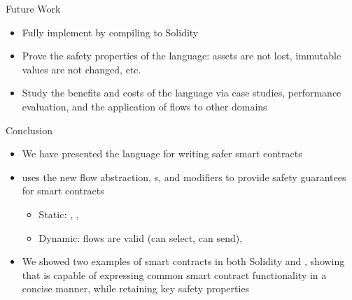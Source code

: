\documentclass[leqno,presentation,usenames,dvipsnames]{beamer}
\begin{document}
\begin{frame}{Future Work}
    \begin{itemize}
        \item Fully implement \langName by compiling to Solidity
        \item Prove the safety properties of the language: assets are not lost, immutable values are not changed, etc.
        \item Study the benefits and costs of the language via case studies, performance evaluation, and the application of flows to other domains
    \end{itemize}
\end{frame}

\begin{frame}{Conclusion}
    \begin{itemize}
        \item We have presented the \langName language for writing safer smart contracts
        \item \langName uses the new flow abstraction, \assetTxt{}s, and modifiers to provide safety guarantees for smart contracts
            \begin{itemize}
                \item Static: , , 
                \item Dynamic: flows are valid (can select, can send), 
            \end{itemize}
        \item We showed two examples of smart contracts in both Solidity and \langName, showing that \langName is capable of expressing common smart contract functionality in a concise manner, while retaining key safety properties
    \end{itemize}
\end{frame}
\end{document}
